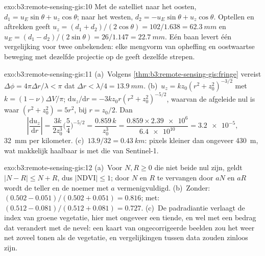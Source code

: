 \begin{solution}{exo:b3:remote-sensing-gis:10}
Met de satelliet naar het oosten, $d_1 = u_E\sin\theta + u_z\cos\theta$; naar het
westen, $d_2 = -u_E\sin\theta + u_z\cos\theta$. Optellen en aftrekken geeft
$u_z = (d_1 + d_2)/(2\cos\theta) = 102/1.638 = \qty{62.3}{mm}$ en $u_E =
(d_1 - d_2)/(2\sin\theta) = 26/1.147 = \qty{22.7}{mm}$. Eén baan levert één
vergelijking voor twee onbekenden: elke mengvorm van opheffing en oostwaartse
beweging met dezelfde projectie op de  geeft dezelfde strepen.
\end{solution}

\begin{solution}{exo:b3:remote-sensing-gis:11}
(a)~Volgens \cref{thm:b3:remote-sensing-gis:fringe} vereist $\Delta\phi =
4\pi\Delta r/\lambda < \pi$ dat $\Delta r < \lambda/4 =
\qty{13.9}{mm}$. (b)~$u_z = k z_0(r^2 + z_0^2)^{-3/2}$ met $k = (1 -
\nu)\Delta V/\pi$; $\mathrm du_z/\mathrm dr = -3kz_0r(r^2 + z_0^2)^{-5/2}$,
waarvan de afgeleide nul is waar $(r^2 + z_0^2) = 5r^2$, bij $r = z_0/2$. Dan
\[
\left|\frac{\mathrm du_z}{\mathrm dr}\right| = \frac{3k}{2z_0^3}\Big(\frac54\Big)^{-5/2}
= \frac{0.859\,k}{z_0^3} = \frac{0.859\times\num{2.39e6}}{\num{6.4e10}} = \num{3.2e-5},
\]
\qty{32}{mm} per kilometer. (c)~$13.9/32 = \qty{0.43}{km}$: pixels kleiner dan
ongeveer \qty{430}{m}, wat makkelijk haalbaar is met die van Sentinel-1.
\end{solution}

\begin{solution}{exo:b3:remote-sensing-gis:12}
(a)~Voor $N, R \ge 0$ die niet beide nul zijn, geldt $|N - R| \le N + R$, dus $|\mathrm{NDVI}|
\le 1$; door $N$ en $R$ te vervangen door $aN$ en $aR$ wordt de teller en de noemer
met $a$ vermenigvuldigd. (b)~Zonder: $(0.502 - 0.051)/(0.502 + 0.051) =
0.816$; met: $(0.512 - 0.081)/(0.512 + 0.081) = 0.727$. (c)~De padradiantie verlaagt
de index van groene vegetatie, hier met ongeveer een tiende, en wel met een
bedrag dat verandert met de nevel: een kaart van ongecorrigeerde beelden zou
het weer net zoveel tonen als de vegetatie, en vergelijkingen tussen data
zouden zinloos zijn.
\end{solution}

